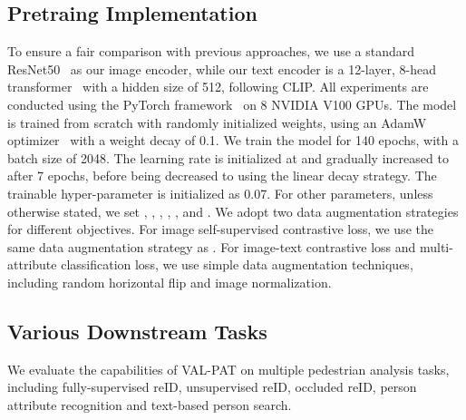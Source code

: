 \documentclass[final]{cvpr}
\begin{document}
\subsection{Pretraing Implementation}
To ensure a fair comparison with previous approaches, we use a standard ResNet50~\cite{he2016deep} as our image encoder, while our text encoder is a 12-layer, 8-head transformer~\cite{vaswani2017attention} with a hidden size of 512, following CLIP. 
All experiments are conducted using the PyTorch framework~\cite{paszke2019pytorch} on 8 NVIDIA V100 GPUs. 
The model is trained from scratch with randomly initialized weights, using an AdamW optimizer~\cite{loshchilov2017decoupled} with a weight decay of 0.1. 
We train the model for 140 epochs, with a batch size of 2048. 
The learning rate is initialized at  and gradually increased to  after 7 epochs, before being decreased to  using the linear decay strategy. 
The trainable hyper-parameter  is initialized as 0.07.
For other parameters, unless otherwise stated, we set , , , , , and . 
We adopt two data augmentation strategies for different objectives. For image self-supervised contrastive loss, we use the same data augmentation strategy as \cite{fu2021unsupervised}. 
For image-text contrastive loss and multi-attribute classification loss, we use simple data augmentation techniques, including random horizontal flip and image normalization.

\subsection{Various Downstream Tasks}
We evaluate the capabilities of VAL-PAT on multiple pedestrian analysis tasks, including fully-supervised reID, unsupervised reID, occluded reID, person attribute recognition and text-based person search.
\end{document}
